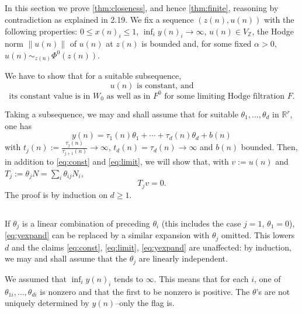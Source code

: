 \documentclass[11pt,a4paper]{article}
\theoremstyle{plain}
\theoremstyle{definition}
\begin{document}
\subsection{}
In this section we prove \ref{thm:closeness}, and hence \ref{thm:finite}, reasoning by contradiction as explained in 2.19. We fix a sequence $(z(n),u(n))$ with the following properties: $0\leq x(n)_i\leq 1$, $\inf_i y(n)_i\to\infty$, $u(n)\in V_{\mathbb{Z}}$, the Hodge norm $\|u(n)\|$ of $u(n)$ at $z(n)$ is bounded and, for some fixed $\alpha>0$, $u(n)\sim_{z(n)}\Phi^0(z(n))$.

We have to show that for a suitable subsequence,
\begin{equation}\label{eq:const}
u(n)\text{ is constant, and}
\end{equation}
\begin{equation}\label{eq:limit}
\text{its constant value is in }W_0\text{ as well as in }F^0\text{ for some limiting Hodge filtration }F.
\end{equation}

Taking a subsequence, we may and shall assume that for suitable $\theta_1,\dots,\theta_d$ in $\mathbb{R}^r$, one has
\begin{equation}\label{eq:yexpand}
y(n)=\tau_1(n)\theta_1+\cdots+\tau_d(n)\theta_d+b(n)
\end{equation}
with $t_j(n):=\frac{\tau_j(n)}{\tau_{j+1}(n)}\to\infty$, $t_d(n)=\tau_d(n)\to\infty$ and $b(n)$ bounded. Then, in addition to \eqref{eq:const} and \eqref{eq:limit}, we will show that, with $v:=u(n)$ and $T_j:=\theta_j N=\sum_i\theta_{ij}N_i$,
\begin{equation}\label{eq:tjv}
T_j v=0.
\end{equation}
The proof is by induction on $d\geq 1$.

\subsection{}
If $\theta_j$ is a linear combination of preceding $\theta_i$ (this includes the case $j=1$, $\theta_1=0$), \eqref{eq:yexpand} can be replaced by a similar expansion with $\theta_j$ omitted. This lowers $d$ and the claims \eqref{eq:const}, \eqref{eq:limit}, \eqref{eq:yexpand} are unaffected: by induction, we may and shall assume that the $\theta_j$ are linearly independent.

We assumed that $\inf_i y(n)_i$ tends to $\infty$. This means that for each $i$, one of $\theta_{1i},\dots,\theta_{di}$ is nonzero and that the first to be nonzero is positive. The $\theta$'s are not uniquely determined by $y(n)$--only the flag is.
\end{document}
